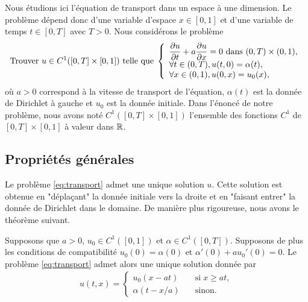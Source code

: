 \documentclass[12pt,a4paper,twoside]{article}
\begin{document}
Nous \'etudions ici l'\'equation de transport dans un espace \`a une dimension.
Le probl\`eme d\'epend donc d'une variable d'espace $x \in [0,1]$ et d'une variable de temps
$t \in [0,T]$ avec $T>0$.
Nous consid\'erons le probl\`eme
\begin{equation}
  \label{eq:transport}
  \text{Trouver $u \in C^1([0,T] \times [0,1] )$ telle que} \;
  \left\{
    \begin{array}{l}
     \dfrac{\partial u}{\partial t} + a \dfrac{\partial u}{\partial x} = 0 
      \text{ dans } (0,T) \times (0,1),
      \\
      \forall t \in (0,T), u(t,0) = \alpha(t) ,
      \\
      \forall x \in (0,1), u(0,x) = u_0(x) ,
    \end{array}
  \right.
\end{equation}
o\`u $a > 0$ correspond \`a la vitesse de transport de l'\'equation,
$\alpha(t)$ est la donn\'ee de Dirichlet \`a gauche
et $u_0$ est la donn\'ee initiale.
Dans l'\'enonc\'e de notre probl\`eme, nous avons not\'e
$C^1([0,T] \times [0,1])$ l'ensemble des fonctions $C^1$
de $[0,T] \times [0,1]$ \`a valeur dans $\mathbb{R}$.
\subsection{Propri\'et\'es g\'en\'erales}

Le probl\`eme \eqref{eq:transport} admet une unique solution $u$.
Cette solution est obtenue en "d\'epla\c{c}ant" la donn\'ee initiale
vers la droite et en "faisant entrer" la donn\'ee de Dirichlet dans le domaine.
De mani\`ere plus rigoureuse, nous avons le th\'eor\`eme suivant.

\begin{theorem}
  \label{thm:transport_existence}
  Supposons que $a > 0$, $u_0 \in C^1([0,1])$ et $\alpha \in C^1([0,T])$.
  Supposons de plus les conditions de compatibilit\'e $u_0(0) = \alpha(0)$
  et $\alpha'(0) +a u_0'(0)=0$.
  Le probl\`eme \eqref{eq:transport} admet alors une unique solution donn\'ee par
  \begin{align}
    \label{eq:transport_sol}
    u(t,x) = 
    \begin{cases} 
      u_0(x-at) \quad &\text{si} \; x \geq at ,
      \\ 
      \alpha(t-x/a) \quad  &\text{sinon} .
    \end{cases}
  \end{align}
\end{theorem}
\end{document}
